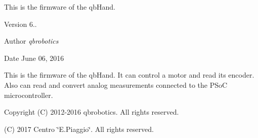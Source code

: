 This is the firmware of the qb\+Hand. \begin{DoxyVersion}{Version}
6..
\end{DoxyVersion}
\begin{DoxyAuthor}{Author}
{\itshape qbrobotics}
\end{DoxyAuthor}
\begin{DoxyDate}{Date}
June 06, 2016
\end{DoxyDate}
This is the firmware of the qb\+Hand. It can control a motor and read its encoder. Also can read and convert analog measurements connected to the P\+SoC microcontroller.

\begin{DoxyCopyright}{Copyright}
(C) 2012-\/2016 qbrobotics. All rights reserved. 

(C) 2017 Centro \char`\"{}\+E.\+Piaggio\char`\"{}. All rights reserved. 
\end{DoxyCopyright}
